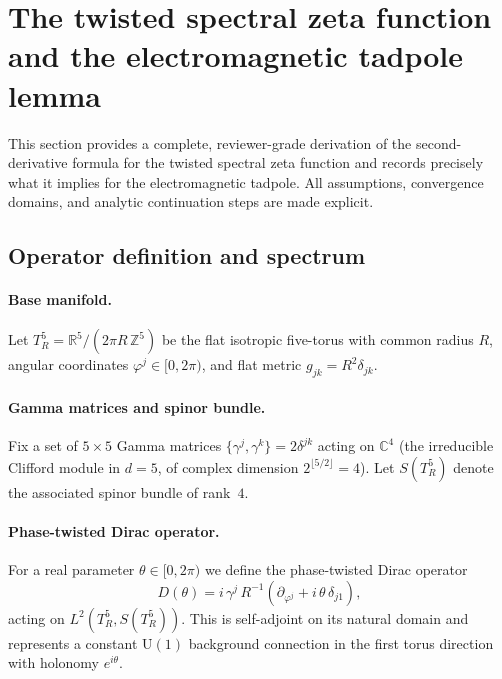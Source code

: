 
\section{The twisted spectral zeta function and the electromagnetic
         tadpole lemma}
\label{sec:zetaLemma}

This section provides a complete, reviewer-grade derivation of the
second-derivative formula for the twisted spectral zeta function and
records precisely what it implies for the electromagnetic tadpole.
All assumptions, convergence domains, and analytic continuation steps
are made explicit.

\subsection{Operator definition and spectrum}
\label{ssec:operator}

\paragraph{Base manifold.}
Let $T^5_R = \mathbb{R}^5/(2\pi R\,\mathbb{Z}^5)$ be the flat isotropic
five-torus with common radius $R$, angular coordinates
$\varphi^j\in[0,2\pi)$, and flat metric $g_{jk}=R^2\delta_{jk}$.

\paragraph{Gamma matrices and spinor bundle.}
Fix a set of $5\times5$ Gamma matrices $\{\gamma^j,\gamma^k\}=2\delta^{jk}$
acting on $\mathbb{C}^4$ (the irreducible Clifford module in $d=5$,
of complex dimension $2^{\lfloor 5/2\rfloor}=4$).  Let
$S(T^5_R)$ denote the associated spinor bundle of rank~$4$.

\paragraph{Phase-twisted Dirac operator.}
For a real parameter $\theta\in[0,2\pi)$ we define the phase-twisted
Dirac operator
\begin{equation}
  \label{eq:DthetaDef}
  D(\theta)
    = i\,\gamma^j\,R^{-1}\!\left(\partial_{\varphi^j}
        + i\,\theta\,\delta_{j1}\right),
\end{equation}
acting on $L^2(T^5_R, S(T^5_R))$.  This is self-adjoint on its natural
domain and represents a constant $\mathrm{U}(1)$ background connection
in the first torus direction with holonomy $e^{i\theta}$.


